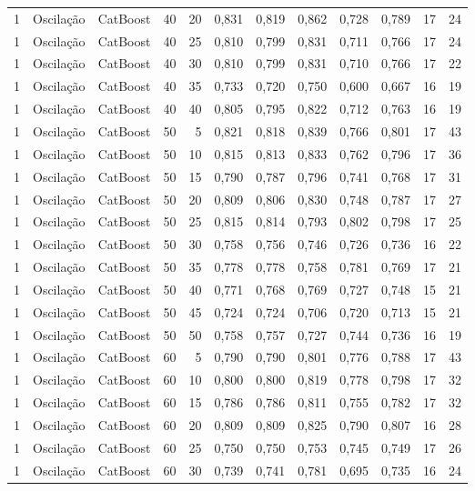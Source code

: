 \begin{longtable}{@{}rllrrrrrrrrr@{}}
1 & Oscilação & CatBoost & 40 & 20 & 0,831 & 0,819 & 0,862 & 0,728 & 0,789 & 17 & 24 \\
1 & Oscilação & CatBoost & 40 & 25 & 0,810 & 0,799 & 0,831 & 0,711 & 0,766 & 17 & 24 \\
1 & Oscilação & CatBoost & 40 & 30 & 0,810 & 0,799 & 0,831 & 0,710 & 0,766 & 17 & 22 \\
1 & Oscilação & CatBoost & 40 & 35 & 0,733 & 0,720 & 0,750 & 0,600 & 0,667 & 16 & 19 \\
1 & Oscilação & CatBoost & 40 & 40 & 0,805 & 0,795 & 0,822 & 0,712 & 0,763 & 16 & 19 \\
1 & Oscilação & CatBoost & 50 & 5 & 0,821 & 0,818 & 0,839 & 0,766 & 0,801 & 17 & 43 \\
1 & Oscilação & CatBoost & 50 & 10 & 0,815 & 0,813 & 0,833 & 0,762 & 0,796 & 17 & 36 \\
1 & Oscilação & CatBoost & 50 & 15 & 0,790 & 0,787 & 0,796 & 0,741 & 0,768 & 17 & 31 \\
1 & Oscilação & CatBoost & 50 & 20 & 0,809 & 0,806 & 0,830 & 0,748 & 0,787 & 17 & 27 \\
1 & Oscilação & CatBoost & 50 & 25 & 0,815 & 0,814 & 0,793 & 0,802 & 0,798 & 17 & 25 \\
1 & Oscilação & CatBoost & 50 & 30 & 0,758 & 0,756 & 0,746 & 0,726 & 0,736 & 16 & 22 \\
1 & Oscilação & CatBoost & 50 & 35 & 0,778 & 0,778 & 0,758 & 0,781 & 0,769 & 17 & 21 \\
1 & Oscilação & CatBoost & 50 & 40 & 0,771 & 0,768 & 0,769 & 0,727 & 0,748 & 15 & 21 \\
1 & Oscilação & CatBoost & 50 & 45 & 0,724 & 0,724 & 0,706 & 0,720 & 0,713 & 15 & 21 \\
1 & Oscilação & CatBoost & 50 & 50 & 0,758 & 0,757 & 0,727 & 0,744 & 0,736 & 16 & 19 \\
1 & Oscilação & CatBoost & 60 & 5 & 0,790 & 0,790 & 0,801 & 0,776 & 0,788 & 17 & 43 \\
1 & Oscilação & CatBoost & 60 & 10 & 0,800 & 0,800 & 0,819 & 0,778 & 0,798 & 17 & 32 \\
1 & Oscilação & CatBoost & 60 & 15 & 0,786 & 0,786 & 0,811 & 0,755 & 0,782 & 17 & 32 \\
1 & Oscilação & CatBoost & 60 & 20 & 0,809 & 0,809 & 0,825 & 0,790 & 0,807 & 16 & 28 \\
1 & Oscilação & CatBoost & 60 & 25 & 0,750 & 0,750 & 0,753 & 0,745 & 0,749 & 17 & 26 \\
1 & Oscilação & CatBoost & 60 & 30 & 0,739 & 0,741 & 0,781 & 0,695 & 0,735 & 16 & 24 \\

\end{longtable}
